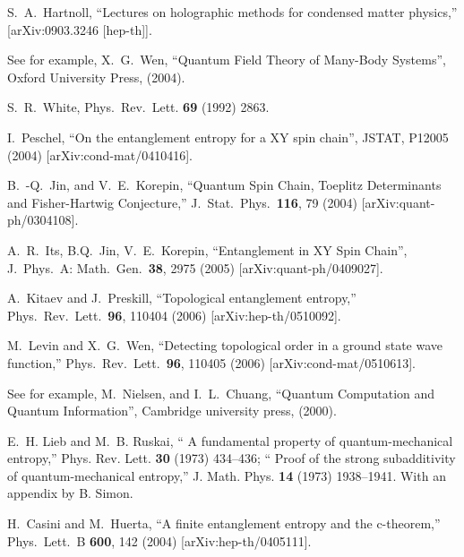 \documentclass[12pt]{article}
\begin{document}
\begin{thebibliography}{99}
  S.~A.~Hartnoll,
  ``Lectures on holographic methods for condensed matter physics,''
  [arXiv:0903.3246 [hep-th]].













See for example, X.~G.~Wen, ``Quantum Field Theory of Many-Body Systems'',
Oxford University Press, (2004).


S.~R.~White,
Phys.\ Rev.\  Lett. {\bf 69} (1992) 2863.



I.\ Peschel,
``On the entanglement entropy for a XY spin chain'',
JSTAT, P12005 (2004)
[arXiv:cond-mat/0410416].

B.\ -Q.\ Jin, and V.\ E.\ Korepin,
``Quantum Spin Chain, Toeplitz Determinants and Fisher-Hartwig Conjecture,''
J.\ Stat.\ Phys.\, \textbf{116}, 79 (2004)
[arXiv:quant-ph/0304108].


A.\ R.\ Its, B.\-Q.\ Jin, V.\ E.\ Korepin,
``Entanglement in XY Spin Chain'',
J.\ Phys.\ A: Math.\ Gen.\ \textbf{38}, 2975 (2005)
[arXiv:quant-ph/0409027].




A.~Kitaev and J.~Preskill,
  ``Topological entanglement entropy,''
Phys.\ Rev.\ Lett.\ \textbf{96}, 110404 (2006)
[arXiv:hep-th/0510092].

M.~Levin and X.~G.~Wen,
  ``Detecting topological order in a ground state wave function,''
Phys.\ Rev.\ Lett.\ \textbf{96}, 110405 (2006)
  [arXiv:cond-mat/0510613].


See for example, M.\ Nielsen, and I.\ L.\ Chuang,
``Quantum Computation and Quantum Information'', Cambridge university press,
(2000).


E.~H. Lieb and M.~B. Ruskai,
`` A fundamental property of quantum-mechanical
  entropy,''
  Phys. Rev. Lett. {\bf 30} (1973) 434--436;
  `` Proof of the strong subadditivity of
  quantum-mechanical entropy,''
  J. Math. Phys. {\bf 14} (1973)
  1938--1941. With an appendix by B. Simon.


  H.~Casini and M.~Huerta,
  ``A finite entanglement entropy and the c-theorem,''
  Phys.\ Lett.\ B {\bf 600}, 142 (2004)
  [arXiv:hep-th/0405111].





\end{thebibliography}
\end{document}
